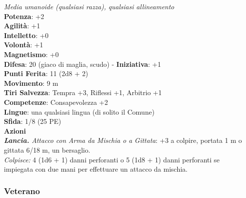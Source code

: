 \begin{multicols}{2}
\emph{Media umanoide (qualsiasi razza), qualsiasi allineamento}\\
\textbf{Potenza}: +2\\
\textbf{Agilità}: +1\\
\textbf{Intelletto}: +0\\
\textbf{Volontà}: +1\\
\textbf{Magnetismo}: +0\\
\textbf{Difesa}: 20 (giaco di maglia, scudo) - \textbf{Iniziativa}: +1\\
\textbf{Punti Ferita}: 11 (2d8 + 2)\\
\textbf{Movimento}: 9 m\\
\textbf{Tiri Salvezza}: Tempra +3, Riflessi +1, Arbitrio +1 \\
\textbf{Competenze}: Consapevolezza +2\\
\textbf{Lingue}: una qualsiasi lingua (di solito il Comune)\\
\textbf{Sfida}: 1/8 (25 PE)\smallskip\\
\smallskip\textbf{Azioni}\\
\emph{\textbf{Lancia.} Attacco con Arma da Mischia o a Gittata}: +3 a colpire, portata 1 m o gittata 6/18 m, un bersaglio.\\
\emph{Colpisce:} 4 (1d6 + 1) danni perforanti o 5 (1d8 + 1) danni perforanti se impiegata con due mani per effettuare un attacco da mischia.\\

\subsubsection{Veterano}


\end{multicols}
